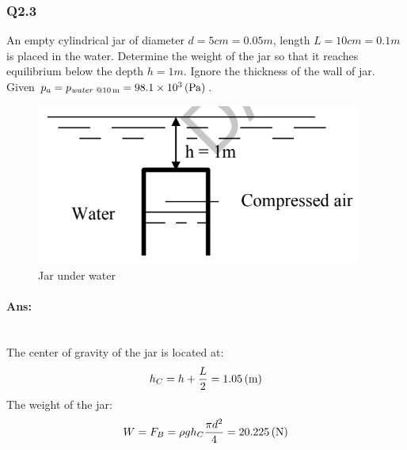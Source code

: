 \subsubsection{Q2.3}
An empty cylindrical jar of diameter $ d = 5 \unit{cm}=0.05\unit{m}$, length $L = 10 \unit{cm} =0.1\unit{m}$ is placed in the water. Determine the weight of the jar so that it reaches equilibrium below the depth $ h = 1\unit{m} $. Ignore the thickness of the wall of jar. Given $ p_a = p_{\textit{water }@10\, \mathrm{m}} = 98.1\times10^3\, (\mathrm{Pa})$.
\begin{figure}[h]
	\centering
	\includegraphics[width=0.4\linewidth]{"2020-08-15 15.00.04 drive.google.com a5d89daba201"}
	\caption{Jar under water}
	\label{fig:3}
\end{figure}
\paragraph{Ans:}$  $\\
The center of gravity of the jar is located at:\\
\[h_C = h+\dfrac{L}{2} = 1.05\, (\mathrm{m})\]
The weight of the jar:\\
\[W = F_B = \rho gh_C \dfrac{\pi d^2}{4} = 20.225\, (\mathrm{N})\]

